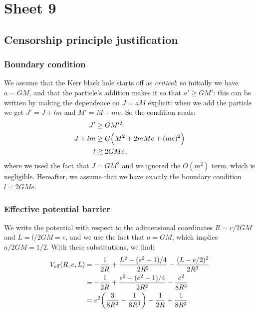 \documentclass[main.tex]{subfiles}
\begin{document}
\section{Sheet 9}

\subsection{Censorship principle justification}

\subsubsection{Boundary condition}

We assume that the Kerr black hole starts off as \emph{critical}: so initially we have \(a = GM\), and that the particle's addition makes it so that \(a' \geq G M'\): this can be written by making the dependence on \(J = aM\) explicit: when we add the particle we get \(J'= J + lm\) and \(M' = M + me\). So the condition reads: 
%
\begin{subequations}
\begin{align}
  J' &\geq G M^{\prime 2}  \\
  J + lm &\geq G \qty(M^2 + 2mMe + (me)^2)  \\
  l &\gtrsim 2GM e
  \,,
\end{align}
\end{subequations}
%
where we used the fact that \(J = G M^2\) and we ignored the \(O(m^2)\) term, which is negligible. 
Hereafter, we assume that we have exactly the boundary condition \(l = 2GMe\). 

\subsubsection{Effective potential barrier}

We write the potential with respect to the adimensional coordinates \(R = r/2GM\) and \(L= l/2GM = e\), and we  use the fact that \(a = GM\), which implies \(a/2GM = 1/2\). With these substitutions, we find: 
%
\begin{align}
  V _{\text{eff}} (R, e, L) &= 
  - \frac{1}{2R} 
  + \frac{L^2 -  (e^2 - 1) / 4 }{2R^2}
  - \frac{(L - e/2)^2}{2R^3}  \\
  &=   - \frac{1}{2R} 
  + \frac{e^2 -  (e^2 - 1) / 4 }{2R^2}
  - \frac{e^2}{8R^3}  \\
  &= e^2 \qty(\frac{3}{8R^2} - \frac{1}{8R^3}) - \frac{1}{2R} + \frac{1}{8R^2}
\,.
\end{align}
\end{document}
